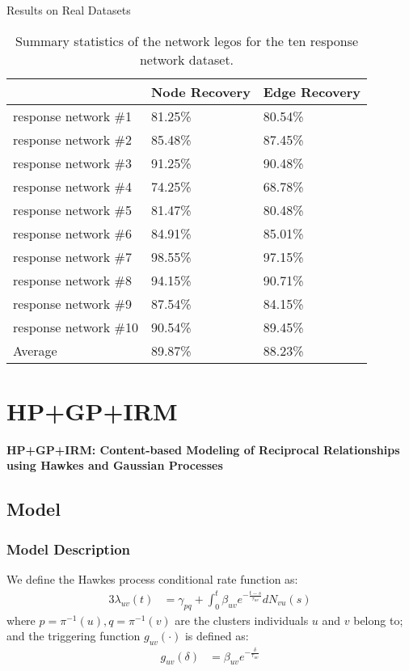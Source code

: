 \documentclass{beamer}
\begin{document}
\begin{frame}
Results on Real Datasets
\begin{table}[ht]
\centering
    \begin{tabular}{ | l | l | l |}
    \hline
      & Node Recovery & Edge Recovery \\ \hline
    response network \#1 & 81.25\% & 80.54\% \\ \hline     
    response network \#2 & 85.48\% & 87.45\% \\ \hline     
    response network \#3 & 91.25\% & 90.48\% \\ \hline     
    response network \#4 & 74.25\% & 68.78\% \\ \hline
    response network \#5 & 81.47\% & 80.48\% \\ \hline
    response network \#6 & 84.91\% & 85.01\% \\ \hline
    response network \#7 & 98.55\% & 97.15\% \\ \hline
    response network \#8 & 94.15\% & 90.71\% \\ \hline
    response network \#9 & 87.54\% & 84.15\% \\ \hline
    response network \#10 & 90.54\% & 89.45\% \\ \hline
    Average & 89.87\% & 88.23\% \\ \hline    
    \end{tabular}
    \caption{Summary statistics of the network legos for the ten response network dataset.}
    \label{table: summary for ten}
\end{table} 
\end{frame}

\section{HP+GP+IRM}
\begin{frame}
\begin{center}
{\bf{HP+GP+IRM: Content-based Modeling of Reciprocal Relationships using Hawkes and Gaussian Processes}}
\end{center}
\end{frame}

\subsection{Model}

\begin{frame}
\frametitle{Model Description}
We define the Hawkes process conditional rate function as:
\begin{alignat}{3}
	\lambda_{uv}(t) &= \gamma_{pq} + \int_0^t \beta_{uv} e^{-\frac{t-s}{\tau_{uv}}} dN_{vu}(s)
\end{alignat}
where $p = \pi^{-1}(u), q = \pi^{-1}(v)$ are the clusters individuals $u$ and $v$ belong to; and the triggering function $g_{uv}(\cdot)$ is defined as:
\begin{align}
	g_{uv}(\delta) &= \beta_{uv} e^{-\frac{\delta}{\tau_{uv}}}
\end{align}
\end{frame}
\end{document}
